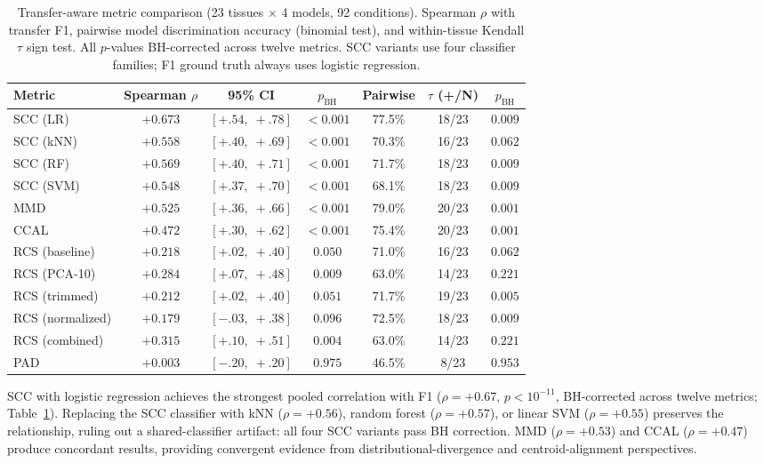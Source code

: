 \documentclass[11pt]{article}
\begin{document}
\medskip
\begin{table}[t]
\centering
\caption{Transfer-aware metric comparison (23 tissues $\times$ 4
models, 92 conditions). Spearman $\rho$ with transfer F1, pairwise
model discrimination accuracy (binomial test), and within-tissue
Kendall $\tau$ sign test. All $p$-values BH-corrected across twelve
metrics. SCC variants use four classifier families; F1 ground truth
always uses logistic regression.}
\label{tab:scc}
\small
\begin{tabular}{@{}lcccccc@{}}
\toprule
Metric & Spearman $\rho$ & 95\% CI & $p_{\text{BH}}$ & Pairwise & $\tau$ (+/N) & $p_{\text{BH}}$ \\
\midrule
SCC (LR)         & $+0.673$ & $[+.54,\;+.78]$ & $<0.001$ & 77.5\% & 18/23 & $0.009$ \\
SCC (kNN)        & $+0.558$ & $[+.40,\;+.69]$ & $<0.001$ & 70.3\% & 16/23 & $0.062$ \\
SCC (RF)         & $+0.569$ & $[+.40,\;+.71]$ & $<0.001$ & 71.7\% & 18/23 & $0.009$ \\
SCC (SVM)        & $+0.548$ & $[+.37,\;+.70]$ & $<0.001$ & 68.1\% & 18/23 & $0.009$ \\
\midrule
MMD              & $+0.525$ & $[+.36,\;+.66]$ & $<0.001$ & 79.0\% & 20/23 & $0.001$ \\
CCAL             & $+0.472$ & $[+.30,\;+.62]$ & $<0.001$ & 75.4\% & 20/23 & $0.001$ \\
\midrule
RCS (baseline)   & $+0.218$ & $[+.02,\;+.40]$ & $0.050$  & 71.0\% & 16/23 & $0.062$ \\
RCS (PCA-10)     & $+0.284$ & $[+.07,\;+.48]$ & $0.009$  & 63.0\% & 14/23 & $0.221$ \\
RCS (trimmed)    & $+0.212$ & $[+.02,\;+.40]$ & $0.051$  & 71.7\% & 19/23 & $0.005$ \\
RCS (normalized) & $+0.179$ & $[-.03,\;+.38]$ & $0.096$  & 72.5\% & 18/23 & $0.009$ \\
RCS (combined)   & $+0.315$ & $[+.10,\;+.51]$ & $0.004$  & 63.0\% & 14/23 & $0.221$ \\
\midrule
PAD              & $+0.003$ & $[-.20,\;+.20]$ & $0.975$  & 46.5\% &  8/23 & $0.953$ \\
\bottomrule
\end{tabular}
\end{table}

SCC with logistic regression achieves the strongest pooled correlation
with F1 ($\rho = +0.67$, $p < 10^{-11}$, BH-corrected across twelve
metrics; Table~\ref{tab:scc}). Replacing the SCC classifier with
kNN ($\rho = +0.56$), random forest ($\rho = +0.57$), or linear SVM
($\rho = +0.55$) preserves the relationship, ruling out a shared-classifier
artifact: all four SCC variants pass BH correction.
MMD ($\rho = +0.53$) and CCAL ($\rho = +0.47$) produce concordant
results, providing convergent evidence from distributional-divergence
and centroid-alignment perspectives.
\end{document}
